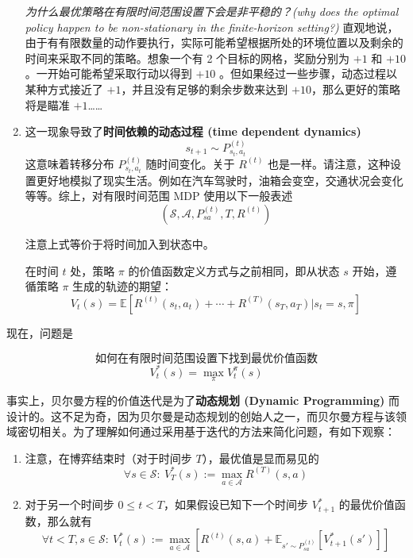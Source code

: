 \begin{enumerate}
    \textit{为什么最优策略在有限时间范围设置下会是非平稳的？(why does the optimal policy happen to be non-stationary in the finite-horizon setting?)} 直观地说，由于有有限数量的动作要执行，实际可能希望根据所处的环境位置以及剩余的时间来采取不同的策略。想象一个有 2 个目标的网格，奖励分别为 $+1$ 和 $+10$。一开始可能希望采取行动以得到 $+10$ 。但如果经过一些步骤，动态过程以某种方式接近了 $+1$，并且没有足够的剩余步数来达到 $+10$，那么更好的策略将是瞄准 $+1$……

    \item 这一现象导致了\textbf{时间依赖的动态过程 (time dependent dynamics)}
    \[
        s_{t+1} \sim P^{(t)}_{s_t, a_t}
    \]
    这意味着转移分布 $P^{(t)}_{s_t, a_t}$ 随时间变化。关于 $R^{(t)}$ 也是一样。请注意，这种设置更好地模拟了现实生活。例如在汽车驾驶时，油箱会变空，交通状况会变化等等。综上，对有限时间范围 MDP 使用以下一般表述
    \[
        (\mathcal{S}, \mathcal{A}, P^{(t)}_{sa}, T, R^{(t)})
    \]

    \begin{remark*}
        注意上式等价于将时间加入到状态中。
    \end{remark*}

    在时间 $t$ 处，策略 $\pi$ 的价值函数定义方式与之前相同，即从状态 $s$ 开始，遵循策略 $\pi$ 生成的轨迹的期望：
    \[
        V_t(s) = \mathbb{E}[R^{(t)}(s_t, a_t) + \cdots + R^{(T)}(s_T, a_T) | s_t = s, \pi]
    \]
\end{enumerate}

现在，问题是

\[
    \textit{如何在有限时间范围设置下找到最优价值函数}
\]
\[
    V_t^*(s) = \max_{\pi} V_t^{\pi}(s)
\]

事实上，贝尔曼方程的价值迭代是为了\textbf{动态规划 (Dynamic Programming)} 而设计的。这不足为奇，因为贝尔曼是动态规划的创始人之一，而贝尔曼方程与该领域密切相关。为了理解如何通过采用基于迭代的方法来简化问题，有如下观察：

\begin{enumerate}
    \item 注意，在博弈结束时（对于时间步 $T$），最优值是显而易见的
    \begin{equation} \label{eq:16.1}
        \forall s \in \mathcal{S}: \ V_T^*(s) := \max_{a \in \mathcal{A}} R^{(T)}(s, a)
    \end{equation}
    \item 对于另一个时间步 $0 \leq t < T$，如果假设已知下一个时间步 $V_{t+1}^*$ 的最优价值函数，那么就有
    \begin{equation} \label{eq:16.2}
        \forall t < T, s \in \mathcal{S}: \ V_t^*(s) := \max_{a \in \mathcal{A}} \left[ R^{(t)}(s, a) + \mathbb{E}_{s' \sim P_{sa}^{(t)}} [V_{t+1}^*(s')] \right]
    \end{equation}
\end{enumerate}

